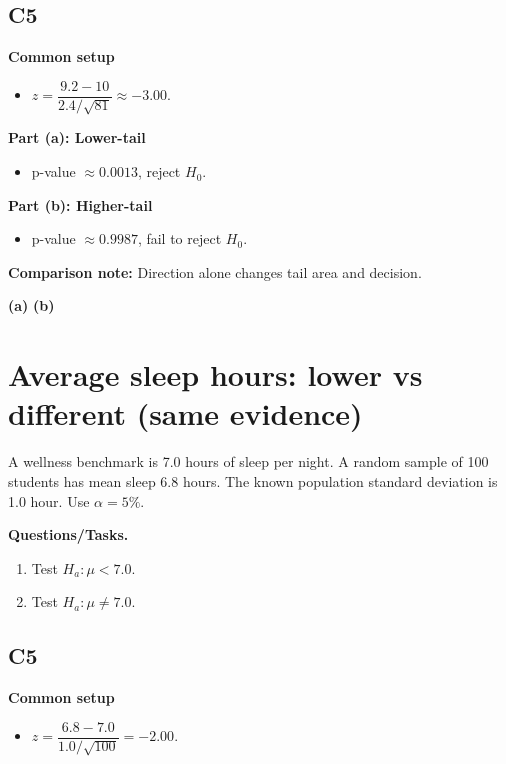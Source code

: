 \subsection*{C5}
\textbf{Common setup}
\begin{itemize}
    \item \(z=\dfrac{9.2-10}{2.4/\sqrt{81}}\approx -3.00\).
\end{itemize}

\textbf{Part (a): Lower-tail}
\begin{itemize}
    \item p-value \(\approx0.0013\), reject \(H_0\).
\end{itemize}

\textbf{Part (b): Higher-tail}
\begin{itemize}
    \item p-value \(\approx0.9987\), fail to reject \(H_0\).
\end{itemize}

\textbf{Comparison note:} Direction alone changes tail area and decision.

\begin{center}
\textbf{(a)}\;
\hspace{0.8cm}
\textbf{(b)}\;
\end{center}

\section{Average sleep hours: lower vs different (same evidence)}
A wellness benchmark is 7.0 hours of sleep per night. A random sample of 100 students has mean sleep 6.8 hours. The known population standard deviation is 1.0 hour. Use \(\alpha=5\%\).

\textbf{Questions/Tasks.}
\begin{enumerate}
    \item[(a)] Test \(H_a\colon \mu<7.0\).
    \item[(b)] Test \(H_a\colon \mu\ne7.0\).
\end{enumerate}

\subsection*{C5}
\textbf{Common setup}
\begin{itemize}
    \item \(z=\dfrac{6.8-7.0}{1.0/\sqrt{100}}=-2.00\).
\end{itemize}

